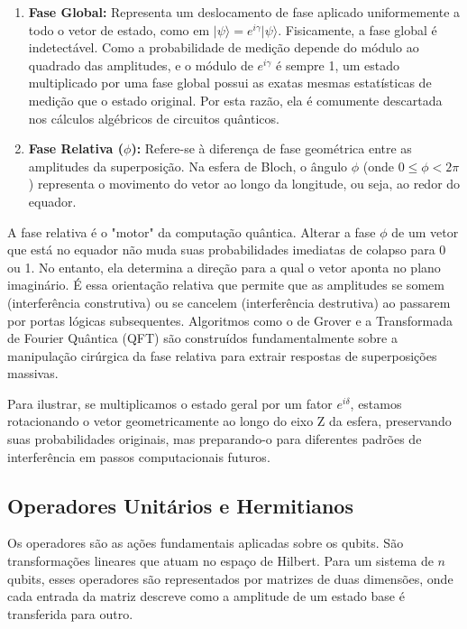 \documentclass[12pt, a4paper]{article}
\newcommand{\ket}[1]{\lvert #1 \rangle}
\begin{document}
\begin{enumerate}
    \item \textbf{Fase Global:} Representa um deslocamento de fase aplicado uniformemente a todo o vetor de estado, como em $\ket{\psi} = e^{i\gamma}\ket{\psi}$. Fisicamente, a fase global é indetectável. Como a probabilidade de medição depende do módulo ao quadrado das amplitudes, e o módulo de $e^{i\gamma}$ é sempre 1, um estado multiplicado por uma fase global possui as exatas mesmas estatísticas de medição que o estado original. Por esta razão, ela é comumente descartada nos cálculos algébricos de circuitos quânticos. 

    \item \textbf{Fase Relativa ($\phi$):} Refere-se à diferença de fase geométrica entre as amplitudes da superposição. Na esfera de Bloch, o ângulo $\phi$ (onde $0 \le \phi < 2\pi$) representa o movimento do vetor ao longo da longitude, ou seja, ao redor do equador. 
\end{enumerate}

A fase relativa é o "motor" da computação quântica. Alterar a fase $\phi$ de um vetor que está no equador não muda suas probabilidades imediatas de colapso para 0 ou 1. No entanto, ela determina a direção para a qual o vetor aponta no plano imaginário. É essa orientação relativa que permite que as amplitudes se somem (interferência construtiva) ou se cancelem (interferência destrutiva) ao passarem por portas lógicas subsequentes. Algoritmos como o de Grover e a Transformada de Fourier Quântica (QFT) são construídos fundamentalmente sobre a manipulação cirúrgica da fase relativa para extrair respostas de superposições massivas.

Para ilustrar, se multiplicamos o estado geral por um fator $e^{i\delta}$, estamos rotacionando o vetor geometricamente ao longo do eixo Z da esfera, preservando suas probabilidades originais, mas preparando-o para diferentes padrões de interferência em passos computacionais futuros.

\subsection{Operadores Unitários e Hermitianos}
Os operadores são as ações fundamentais aplicadas sobre os qubits. São transformações lineares que atuam no espaço de Hilbert. Para um sistema de $n$ qubits, esses operadores são representados por matrizes de duas dimensões, onde cada entrada da matriz descreve como a amplitude de um estado base é transferida para outro.
\end{document}
